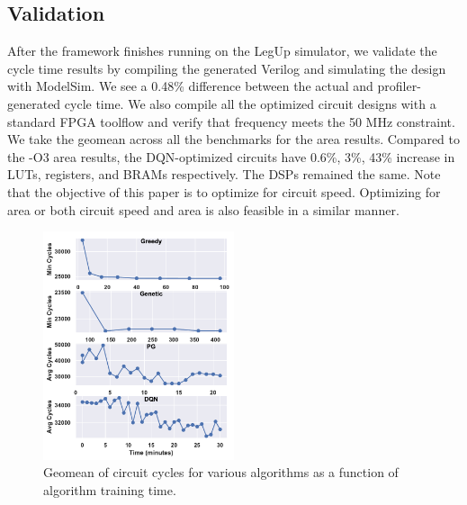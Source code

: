 \subsection{Validation}
\vspace{-0.1cm}
After the framework finishes running on the LegUp simulator, we validate the cycle time results by compiling the generated Verilog and simulating the design with ModelSim. 
We see a 0.48\% difference between the actual and profiler-generated cycle time. 
We also compile all the optimized circuit designs with a standard FPGA toolflow and verify that frequency meets the 50 MHz constraint. We take the geomean across all the benchmarks for the area results. Compared to the -O3 area results, the DQN-optimized circuits have 0.6\%, 3\%, 43\% increase in LUTs, registers, and BRAMs respectively. The DSPs remained the same. Note that the objective of this paper is to optimize for circuit speed. Optimizing for area or both circuit speed and area is also feasible in a similar manner.

\begin{figure}[!t]
    \centering
    \includegraphics[trim={0cm 0cm 0cm 0.3cm},clip,width=0.5\textwidth]{Figures/12vstime.pdf}
    \vspace{-0.7cm}
    \caption{Geomean of circuit cycles for various algorithms as a function of algorithm training time.}
    \label{fig:12vstime}
    \vspace{-0.5cm}
\end{figure}

